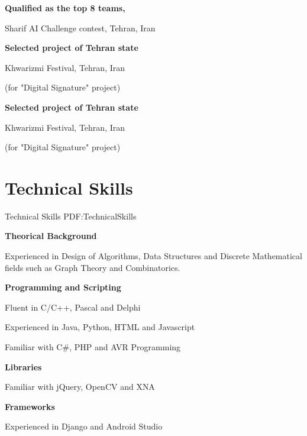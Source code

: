 \documentclass[a4paper,10pt,oneside]{article}
\begin{document}
\begin{body}
\EntryGap
{\textbf{Qualified as the top 8 teams,}}
\hfill
{}
\par
Sharif AI Challenge contest, Tehran, Iran
\begin{detail}
\end{detail}

\EntryGap
{\textbf{Selected project of Tehran state}}
\hfill
{}
\par
Khwarizmi Festival, Tehran, Iran
\begin{detail}
(for "Digital Signature" project)
\end{detail}

\EntryGap
{\textbf{Selected project of Tehran state}}
\hfill
{}
\par
Khwarizmi Festival, Tehran, Iran
\begin{detail}
(for "Digital Signature" project)
\end{detail}


\section
{Technical Skills}
{Technical Skills}
{PDF:TechnicalSkills}

{\textbf{Theorical Background}}
\hfill
\par
Experienced in Design of Algorithms, Data Structures and Discrete Mathematical
fields such as Graph Theory and Combinatorics.
\begin{detail}
\end{detail}

\EntryGap
{\textbf{Programming and Scripting}}
\hfill
\par
Fluent in C/C++, Pascal and Delphi
\par
Experienced in Java, Python, HTML and Javascript
\par
Familiar with C\#, PHP and AVR Programming
\begin{detail}
\end{detail}

\EntryGap
{\textbf{Libraries}}
\hfill
\par
Familiar with jQuery, OpenCV and XNA
\begin{detail}
\end{detail}

\EntryGap
{\textbf{Frameworks}}
\hfill
\par
Experienced in Django and Android Studio
\begin{detail}
\end{detail}


\end{body}
\end{document}
